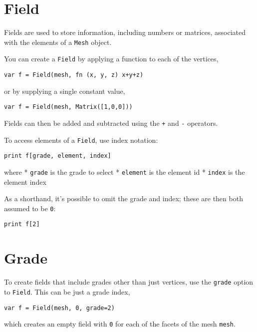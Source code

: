 \hypertarget{field}{%
\section{Field}\label{field}}

Fields are used to store information, including numbers or matrices,
associated with the elements of a \texttt{Mesh} object.

You can create a \texttt{Field} by applying a function to each of the
vertices,

\begin{lstlisting}
var f = Field(mesh, fn (x, y, z) x+y+z)
\end{lstlisting}

or by supplying a single constant value,

\begin{lstlisting}
var f = Field(mesh, Matrix([1,0,0]))
\end{lstlisting}

Fields can then be added and subtracted using the \texttt{+} and
\texttt{-} operators.

To access elements of a \texttt{Field}, use index notation:

\begin{lstlisting}
print f[grade, element, index]
\end{lstlisting}

where * \texttt{grade} is the grade to select * \texttt{element} is the
element id * \texttt{index} is the element index

As a shorthand, it's possible to omit the grade and index; these are
then both assumed to be \texttt{0}:

\begin{lstlisting}
print f[2]
\end{lstlisting}

\hypertarget{grade}{%
\section{Grade}\label{grade}}

To create fields that include grades other than just vertices, use the
\texttt{grade} option to \texttt{Field}. This can be just a grade index,

\begin{lstlisting}
var f = Field(mesh, 0, grade=2)
\end{lstlisting}

which creates an empty field with \texttt{0} for each of the facets of
the mesh \texttt{mesh}.

